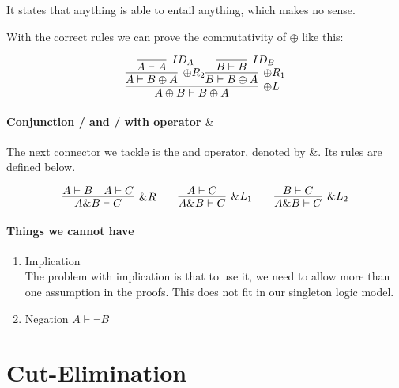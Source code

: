 \documentclass{article}
\begin{document}
It states that anything is able to entail anything, which makes no sense.

\medskip

With the correct rules we can prove  the commutativity of \(\oplus\) like this:

\[
\infer[{\oplus L}]
{A \oplus B \vdash B \oplus A}
{
	\infer[{\oplus R_2}]
	{A \vdash B \oplus A}
	{
		\infer[{ID_A}]
		{A \vdash A}
		{}
	}
	\infer[{\oplus R_1}]
	{B \vdash B \oplus A}
	{
		\infer[{ID_B}]
		{B \vdash B}
		{}
	}
}
\]



\paragraph{Conjunction / and / with operator \(\&\)}
The next connector we tackle is the and operator, denoted by \(\&\). Its rules are defined below. 

\[
\infer[{ \& R}]
{A \& B \vdash C}
{A \vdash B & A \vdash C}
\qquad
\infer[{\& L_1}]
{A \& B \vdash C}
{A \vdash C}
\qquad
\infer[{\& L_2}]
{A \& B \vdash C}
{B \vdash C}
\]


\paragraph{Things we cannot have}
\begin{enumerate}
	\item Implication \\
	      The problem with implication is that to use it, we need to allow 
	      more than one assumption in the proofs. This does not fit in our
	      singleton logic model.
	\item Negation \(A \vdash \neg B\)
\end{enumerate}





\section{Cut-Elimination}
\end{document}
